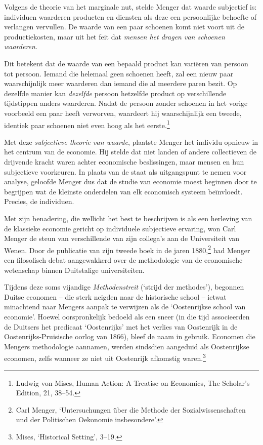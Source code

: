 \documentclass[smalldemyvopaper,11pt,twoside,onecolumn,openright,extrafontsizes,hidelinks]{memoir}
\begin{document}
Volgens de theorie van het marginale nut, stelde Menger dat waarde
subjectief is: individuen waarderen producten en diensten als deze een
persoonlijke behoefte of verlangen vervullen. De waarde van een paar
schoenen komt niet voort uit de productiekosten, maar uit het feit dat
\emph{mensen het dragen van schoenen waarderen}.

Dit betekent dat de waarde van een bepaald product kan variëren van
persoon tot persoon. Iemand die helemaal geen schoenen heeft, zal een
nieuw paar waarschijnlijk meer waarderen dan iemand die al meerdere
paren bezit. Op dezelfde manier kan \emph{dezelfde} persoon hetzelfde
product op verschillende tijdstippen anders waarderen. Nadat de persoon
zonder schoenen in het vorige voorbeeld een paar heeft verworven,
waardeert hij waarschijnlijk een tweede, identiek paar schoenen niet
even hoog als het eerste.\footnote{\hspace{0pt}Ludwig von Mises, Human
  Action: A Treatise on Economics, The Scholar's Edition, 21, 38--54.}

Met deze \emph{subjectieve theorie van waarde}, plaatste Menger het
individu opnieuw in het centrum van de economie. Hij stelde dat niet
landen of andere collectieven de drijvende kracht waren achter
economische beslissingen, maar mensen en hun subjectieve voorkeuren. In
plaats van de staat als uitgangspunt te nemen voor analyse, geloofde
Menger dus dat de studie van economie moest beginnen door te begrijpen
wat de kleinste onderdelen van elk economisch systeem beïnvloedt.
Precies, de individuen.

Met zijn benadering, die wellicht het best te beschrijven is als een
herleving van de klassieke economie gericht op individuele subjectieve
ervaring, won Carl Menger de steun van verschillende van zijn collega's
aan de Universiteit van Wenen. Door de publicatie van zijn tweede boek
in de jaren 1880,\footnote{\hspace{0pt}Carl Menger, `Untersuchungen über
  die Methode der Sozialwissenschaften und der Politischen Oekonomie
  insbesondere'.} had Menger een filosofisch debat aangewakkerd over de
methodologie van de economische wetenschap binnen Duitstalige
universiteiten.

Tijdens deze soms vijandige \emph{Methodenstreit} (`strijd der
methodes'), begonnen Duitse economen -- die sterk neigden naar de
historische school -- ietwat minachtend naar Mengers aanpak te verwijzen
als de `Oostenrijkse school van economie'. Hoewel oorspronkelijk bedoeld
als een sneer (in die tijd associeerden de Duitsers het predicaat
`Oostenrijks' met het verlies van Oostenrijk in de
Oostenrijks-Pruisische oorlog van 1866), bleef de naam in gebruik.
Economen die Mengers methodologie aannamen, werden sindsdien aangeduid
als Oostenrijkse economen, zelfs wanneer ze niet uit Oostenrijk
afkomstig waren.\footnote{\hspace{0pt}Mises, `Historical Setting',
  3--19.}
\end{document}
